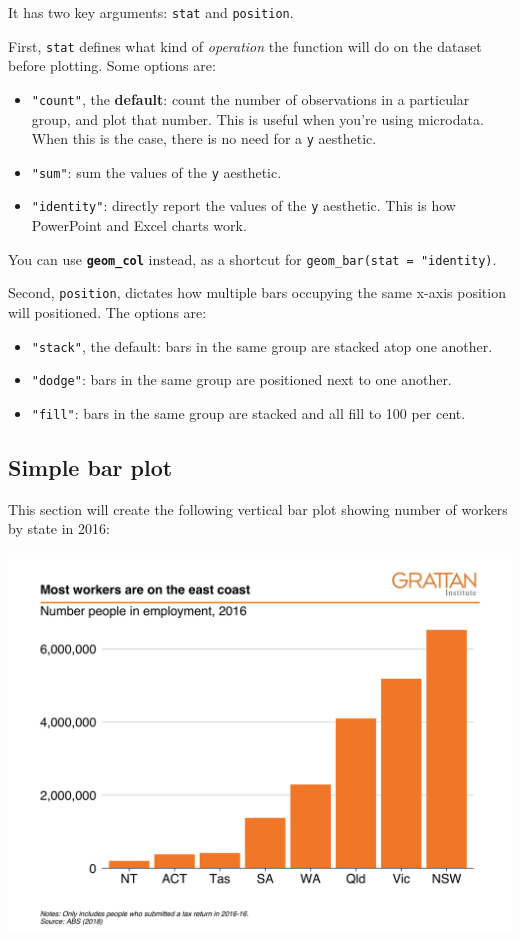 \documentclass[]{book}
\providecommand{\tightlist}{%
  \setlength{\itemsep}{0pt}\setlength{\parskip}{0pt}}
\begin{document}
It has two key arguments: \texttt{stat} and \texttt{position}.

First, \texttt{stat} defines what kind of \emph{operation} the function will do on the dataset before plotting. Some options are:

\begin{itemize}
\tightlist
\item
  \texttt{"count"}, the \textbf{default}: count the number of observations in a particular group, and plot that number. This is useful when you're using microdata. When this is the case, there is no need for a \texttt{y} aesthetic.
\item
  \texttt{"sum"}: sum the values of the \texttt{y} aesthetic.
\item
  \texttt{"identity"}: directly report the values of the \texttt{y} aesthetic. This is how PowerPoint and Excel charts work.
\end{itemize}

You can use \textbf{\texttt{geom\_col}} instead, as a shortcut for \texttt{geom\_bar(stat\ =\ "identity)}.

Second, \texttt{position}, dictates how multiple bars occupying the same x-axis position will positioned. The options are:

\begin{itemize}
\tightlist
\item
  \texttt{"stack"}, the default: bars in the same group are stacked atop one another.
\item
  \texttt{"dodge"}: bars in the same group are positioned next to one another.
\item
  \texttt{"fill"}: bars in the same group are stacked and all fill to 100 per cent.
\end{itemize}

\hypertarget{simple-bar-plot}{%
\subsection{Simple bar plot}\label{simple-bar-plot}}

This section will create the following vertical bar plot showing number of workers by state in 2016:

\includegraphics[width=44.44in]{atlas/simple_bar}
\end{document}

